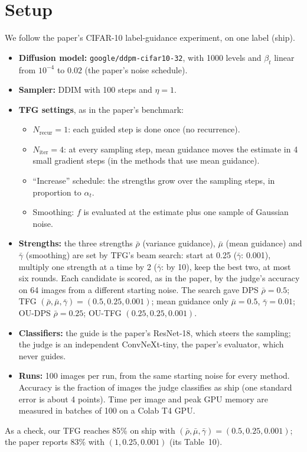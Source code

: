 \documentclass[11pt]{article}
\begin{document}
\section{Setup}
We follow the paper's CIFAR-10 label-guidance experiment, on one label (ship).
\begin{itemize}
  \item \textbf{Diffusion model:} \texttt{google/ddpm-cifar10-32}, with 1000 levels and $\beta_t$ linear from $10^{-4}$
        to $0.02$ (the paper's noise schedule).
  \item \textbf{Sampler:} DDIM with 100 steps and $\eta = 1$.
  \item \textbf{TFG settings}, as in the paper's benchmark:
        \begin{itemize}
          \item $N_{\mathrm{recur}} = 1$: each guided step is done once (no recurrence).
          \item $N_{\mathrm{iter}} = 4$: at every sampling step, mean guidance moves the estimate in 4 small gradient
                steps (in the methods that use mean guidance).
          \item ``Increase'' schedule: the strengths grow over the sampling steps, in proportion to $\alpha_t$.
          \item Smoothing: $f$ is evaluated at the estimate plus one sample of Gaussian noise.
        \end{itemize}
  \item \textbf{Strengths:} the three strengths $\bar\rho$ (variance guidance), $\bar\mu$ (mean guidance) and
        $\bar\gamma$ (smoothing) are set by TFG's beam search: start at 0.25 ($\bar\gamma$: 0.001), multiply one strength
        at a time by 2 ($\bar\gamma$: by 10), keep the best two, at most six rounds. Each candidate is scored, as in the
        paper, by the judge's accuracy on 64 images from a different starting noise. The search gave DPS
        $\bar\rho = 0.5$; TFG $(\bar\rho, \bar\mu, \bar\gamma) = (0.5, 0.25, 0.001)$; mean guidance only $\bar\mu = 0.5$,
        $\bar\gamma = 0.01$; OU-DPS $\bar\rho = 0.25$; OU-TFG $(0.25, 0.25, 0.001)$.
  \item \textbf{Classifiers:} the guide is the paper's ResNet-18, which steers the sampling; the judge is an
        independent ConvNeXt-tiny, the paper's evaluator, which never guides.
  \item \textbf{Runs:} 100 images per run, from the same starting noise for every method. Accuracy is the fraction of
        images the judge classifies as ship (one standard error is about 4 points). Time per image and peak GPU memory
        are measured in batches of 100 on a Colab T4 GPU.
\end{itemize}
As a check, our TFG reaches 85\% on ship with $(\bar\rho, \bar\mu, \bar\gamma) = (0.5, 0.25, 0.001)$; the paper
reports 83\% with $(1, 0.25, 0.001)$ (its Table~10).
\end{document}
